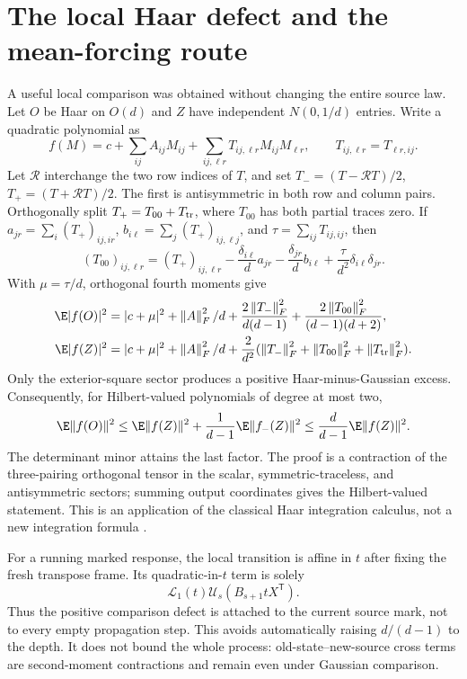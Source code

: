 \documentclass[11pt,oneside,openany,a4paper]{book}
\numberwithin{equation}{chapter}
\theoremstyle{definition}
\theoremstyle{remark}
\newcommand{\T}{\mathsf T}\newcommand{\Id}{I}
\newcommand{\F}[1]{\left\lVert#1\right\rVert_F}
\begin{document}
\section{The local Haar defect and the mean-forcing route}\label{base:con:marked-local}
A useful local comparison was obtained without changing the entire source law. Let $O$ be Haar on $O(d)$ and $Z$ have independent $N(0,1/d)$ entries. Write a quadratic polynomial as
\[
 f(M)=c+\sum_{ij}A_{ij}M_{ij}+\sum_{ij,\ell r}T_{ij,\ell r}M_{ij}M_{\ell r},
 \qquad T_{ij,\ell r}=T_{\ell r,ij}.
\]
Let $\mathscr R$ interchange the two row indices of $T$, and set $T_-=(T-\mathscr RT)/2$, $T_+=(T+\mathscr RT)/2$. The first is antisymmetric in both row and column pairs. Orthogonally split $T_+=T_{00}+T_{\rm tr}$, where $T_{00}$ has both partial traces zero. If
$a_{jr}=\sum_i(T_+)_{ij,ir}$, $b_{i\ell}=\sum_j(T_+)_{ij,\ell j}$, and $\tau=\sum_{ij}T_{ij,ij}$, then
\[
 (T_{00})_{ij,\ell r}=(T_+)_{ij,\ell r}
 -\frac{\delta_{i\ell}}d a_{jr}-\frac{\delta_{jr}}d b_{i\ell}
 +\frac\tau{d^2}\delta_{i\ell}\delta_{jr}.
\]
With $\mu=\tau/d$, orthogonal fourth moments give
\begin{align}
 \E|f(O)|^2&=|c+\mu|^2+\F A^2/d
 +\frac{2\F{T_-}^2}{d(d-1)}+\frac{2\F{T_{00}}^2}{(d-1)(d+2)},\label{base:con:haar-sectors}\\
 \E|f(Z)|^2&=|c+\mu|^2+\F A^2/d
 +\frac2{d^2}(\F{T_-}^2+\F{T_{00}}^2+\F{T_{\rm tr}}^2).\nonumber
\end{align}
Only the exterior-square sector produces a positive Haar-minus-Gaussian excess. Consequently, for Hilbert-valued polynomials of degree at most two,
\[
 \E\|f(O)\|^2\le\E\|f(Z)\|^2+\frac1{d-1}\E\|f_-(Z)\|^2
 \le\frac d{d-1}\E\|f(Z)\|^2.
\]
The determinant minor attains the last factor. The proof is a contraction of the three-pairing orthogonal tensor in the scalar, symmetric-traceless, and antisymmetric sectors; summing output coordinates gives the Hilbert-valued statement. This is an application of the classical Haar integration calculus, not a new integration formula \cite{CS}.

For a running marked response, the local transition is affine in $t$ after fixing the fresh transpose frame. Its quadratic-in-$t$ term is solely
\[
 \mathcal L_1(t)\mathcal U_s(B_{s+1}tX^\T).
\]
Thus the positive comparison defect is attached to the current source mark, not to every empty propagation step. This avoids automatically raising $d/(d-1)$ to the depth. It does not bound the whole process: old-state--new-source cross terms are second-moment contractions and remain even under Gaussian comparison.
\end{document}
